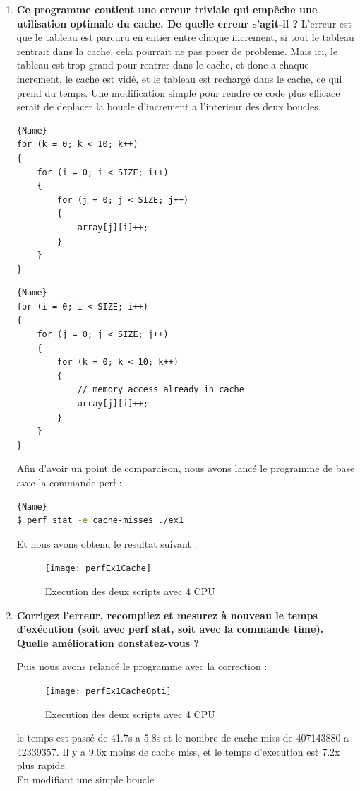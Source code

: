\documentclass[
	a4paper, %
	10pt, %
]{CSUniSchoolLabReport}
\begin{document}
\begin{enumerate}[label=\textbf{\arabic*}]
	\item \textbf{Ce programme contient une erreur triviale qui empêche une utilisation optimale du cache. De quelle erreur s’agit-il ?}
L'erreur est que le tableau est parcuru en entier entre chaque increment, si tout le tableau rentrait dans la cache, cela pourrait ne pas poser de probleme.
Mais ici, le tableau est trop grand pour rentrer dans le cache, et donc a chaque increment, le cache est vidé, et le tableau est rechargé dans le cache, ce qui prend du temps.
Une modification simple pour rendre ce code plus efficace serait de deplacer la boucle d'increment a l'interieur des deux boucles.

\noindent\begin{minipage}{.45\textwidth}
	\begin{lstlisting}[style=CStyle, caption=Code fournis, firstnumber=1]{Name}
for (k = 0; k < 10; k++)
{
	for (i = 0; i < SIZE; i++)
	{
		for (j = 0; j < SIZE; j++)
		{
			array[j][i]++;
		}
	}
}
	\end{lstlisting}
	\end{minipage}\hfill
	\begin{minipage}{.45\textwidth}
	\begin{lstlisting}[style=CStyle, caption=Code modifié, firstnumber=1]{Name}
for (i = 0; i < SIZE; i++)
{
	for (j = 0; j < SIZE; j++)
	{
		for (k = 0; k < 10; k++)
		{
			// memory access already in cache
			array[j][i]++;
		}
	}
}
	\end{lstlisting}
\end{minipage}

Afin d'avoir un point de comparaison, nous avons lancé le programme de base avec la commande perf :
\begin{lstlisting}[language=bash, firstnumber=1]{Name}
$ perf stat -e cache-misses ./ex1
\end{lstlisting}
Et nous avons obtenu le resultat suivant :
\begin{figure}[H]
	\centering
	\texttt{[image: perfEx1Cache]}
	\caption{Execution des deux scripts avec 4 CPU}
	\label{fig:runEx3Share}
\end{figure}

	\item \textbf{Corrigez l’erreur, recompilez et mesurez à nouveau le temps d’exécution (soit avec perf stat, soit avec la commande time). Quelle amélioration constatez-vous ?}


Puis nous avons relancé le programme avec la correction :
\begin{figure}[H]
	\centering
	\texttt{[image: perfEx1CacheOpti]}
	\caption{Execution des deux scripts avec 4 CPU}
	\label{fig:runEx3Share}
\end{figure}
le temps est passé de 41.7s a 5.8s et le nombre de cache miss de 407143880 a 42339357. Il y a 9.6x moins de cache miss, et le temps d'execution est 7.2x plus rapide.\\
En modifiant une simple boucle


\end{enumerate}
\end{document}
